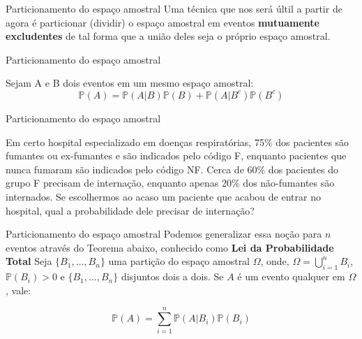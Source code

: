 



\begin{frame}{Particionamento do espaço amostral}
Uma técnica que nos será últil a partir de agora é particionar (dividir) o espaço amostral em eventos \textbf{mutuamente excludentes} de tal forma que a união deles
seja o próprio espaço amostral. 
\end{frame}

\begin{frame}{Particionamento do espaço amostral}
    \begin{definicao}
        Sejam A e B dois eventos em um mesmo espaço amostral:
        $$\mathds{P}(A) = \mathds{P}(A|B)\mathds{P}(B) + \mathds{P}(A|B^c)\mathds{P}(B^c)$$
    \end{definicao}
\end{frame}

\begin{frame}{Particionamento do espaço amostral}
    \begin{exemplo}[1]
        Em certo hospital especializado em doenças respiratórias, 75\% dos pacientes são fumantes ou ex-fumantes e são indicados pelo código F, enquanto pacientes que nunca fumaram são indicados pelo código NF. Cerca de 60\% dos pacientes do grupo F precisam de internação, enquanto apenas 20\% dos não-fumantes  são internados. Se escolhermos ao acaso um paciente que acabou de entrar no hospital, qual a probabilidade dele precisar de internação?
    \end{exemplo}
\end{frame}

\begin{frame}{Particionamento do espaço amostral}
    Podemos generalizar essa noção para $n$ eventos através do Teorema abaixo, conhecido como \textbf{Lei da Probabilidade Total}
    Seja $\{B_1, \dots, B_n\}$ uma partição do espaço amostral $\Omega$, onde, $\Omega=\bigcup_{i=1}^n B_i$, $\mathds{P}(B_i)>0$ e $\{B_1, \dots, B_n\}$ disjuntos dois a dois. Se $A$ é um evento qualquer em $\Omega$, vale:

    $$\mathds{P}(A) = \sum_{i=1}^n \mathds{P}(A|B_i)\mathds{P}(B_i)$$
\end{frame}

